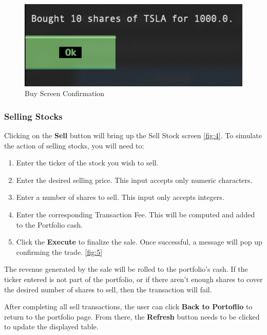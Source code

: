 \documentclass{article}
\begin{document}
\begin{figure}
    \centering
    \includegraphics[width=1\linewidth]{BuyScreenConfirmation.png}
    \caption{Buy Screen  Confirmation}
    \label{fig:3}
\end{figure}


\subsubsection{Selling Stocks}

Clicking on the \textbf{Sell} button will bring up the Sell Stock screen \autoref{fig:4}. To simulate the action of selling stocks, you will need to:
\begin{enumerate}
    \item Enter the ticker of the stock you wish to sell. 
    \item Enter the desired selling price. This input accepts only numeric characters.
    \item Enter a number of shares to sell. This input only accepts integers. 
    \item Enter the corresponding Transaction Fee. This will be computed and added to the Portfolio cash. 
    \item Click the \textbf{Execute} to finalize the sale. Once successful, a message will pop up confirming the trade. \autoref{fig:5}
\end{enumerate}
    The revenue generated by the sale will be rolled to the portfolio's cash. If the ticker entered is not part of the portfolio, or if there aren't enough shares to cover the desired number of shares to sell, then the transaction will fail.
    
    After completing all sell transactions, the user can click \textbf{Back to Portoflio} to return to the portfolio page. From there, the \textbf{Refresh} button needs to be clicked to update the displayed table.
\end{document}
